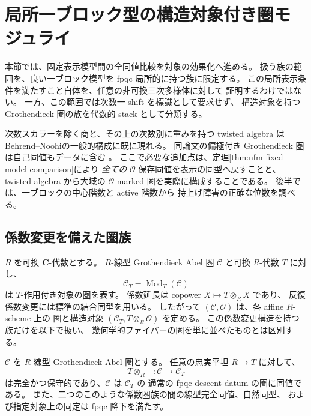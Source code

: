 \section{局所一ブロック型の構造対象付き圏モジュライ}
\label{sec:nfm-local-moduli}

本節では、固定表示模型間の全同値比較を対象の効果化へ進める。
扱う族の範囲を、良い一ブロック模型を fpqc 局所的に持つ族に限定する。
この局所表示条件を満たすこと自体を、任意の非可換三次多様体に対して
証明するわけではない。
一方、この範囲では次数一 shift を標識として要求せず、
構造対象を持つ Grothendieck 圏の族を代数的 stack として分類する。

次数スカラーを除く商と、その上の次数別に重みを持つ twisted algebra は
Behrend--Noohi\cite[Section~2.3]{NFMBehrendNoohi}の一般的構成に既に現れる。
同論文の偏極付き Grothendieck 圏は自己同値もデータに含む
\cite[Section~3.1.2]{NFMBehrendNoohi}。
ここで必要な追加点は、定理\ref{thm:nfm-fixed-model-comparison}により
\emph{全ての} $\mathcal O$-保存同値を表示の同型へ戻すことと、
twisted algebra から大域の $\mathcal O$-marked 圏を実際に構成することである。
後半では、一ブロックの中心階数と active 階数から
持上げ障害の正確な位数を調べる。

\subsection{係数変更を備えた圏族}

$R$ を可換 $\mathbf C$-代数とする。
$R$-線型 Grothendieck Abel 圏 $\mathcal C$ と可換 $R$-代数 $T$ に対し、
\[
 \mathcal C_T=\operatorname{Mod}_T(\mathcal C)
\]
は $T$-作用付き対象の圏を表す。
係数延長は copower $X\mapsto T\otimes_RX$ であり、
反復係数変更には標準の結合同型を用いる。
したがって $(\mathcal C,\mathcal O)$ は、各 affine $R$-scheme 上の
圏と構造対象 $(\mathcal C_T,T\otimes_R\mathcal O)$ を定める。
この係数変更構造を持つ族だけを以下で扱い、
幾何学的ファイバーの圏を単に並べたものとは区別する。

\begin{lemma}
\label{lem:nfm-grothendieck-fpqc}
$\mathcal C$ を $R$-線型 Grothendieck Abel 圏とする。
任意の忠実平坦 $R\to T$ に対して、
\[
 T\otimes_R-:\mathcal C\longrightarrow\mathcal C_T
\]
は完全かつ保守的であり、$\mathcal C$ は $\mathcal C_T$ の
通常の fpqc descent datum の圏に同値である。
また、二つのこのような係数圏族の間の線型完全同値、自然同型、
および指定対象上の同定は fpqc 降下を満たす。
\end{lemma}

